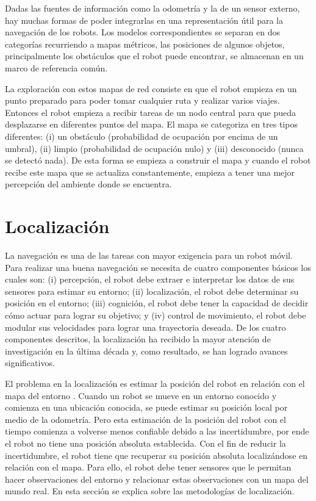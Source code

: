 Dadas las fuentes de informaci\'on como la odometr\'ia y la de un sensor 
externo, hay muchas formas de poder integrarlas en una representaci\'on útil 
para la navegaci\'on de los robots. Los modelos correspondientes se separan 
en dos categor\'ias recurriendo a mapas m\'etricos, las posiciones de algunos 
objetos, principalmente los obst\'aculos que el robot puede encontrar, se 
almacenan en un marco de referencia com\'un.

La exploraci\'on con estos mapas de red consiste en que el robot empieza en 
un punto preparado para poder tomar cualquier ruta y realizar varios 
viajes. Entonces el robot empieza a recibir tareas de un nodo central para 
que pueda desplazarse en diferentes puntos del mapa. El mapa se categoriza 
en tres tipos diferentes: (i) un obst\'aculo (probabilidad de ocupaci\'on 
por encima de un umbral), (ii) limpio (probabilidad de ocupaci\'on nulo) y 
(iii) desconocido (nunca se detectó nada). De esta forma se empieza a 
construir el mapa y cuando el robot recibe este mapa que se actualiza 
constantemente, empieza a tener una mejor percepci\'on del ambiente donde 
se encuentra.


\section{Localizaci\'on}
La navegaci\'on es una de las tareas con mayor exigencia para un robot 
móvil. Para realizar una buena navegaci\'on se necesita de cuatro componentes 
b\'asicos los cuales son: (i) percepci\'on, el robot debe extraer e interpretar 
los datos de sus sensores para estimar su entorno; (ii) localizaci\'on, el robot 
debe determinar su posici\'on en el entorno; (iii) cognici\'on, el robot debe tener 
la capacidad de decidir c\'omo actuar para lograr su objetivo; y (iv) control de 
movimiento, el robot debe modular sus velocidades para lograr una trayectoria 
deseada. De los cuatro componentes descritos, la localizaci\'on ha recibido la 
mayor atenci\'on de investigaci\'on en la \'ultima d\'ecada y, como resultado, se 
han logrado avances significativos. %

El problema en la localización es estimar la posición del robot en 
relación con el mapa del entorno \cite{dellaert1999monte}. Cuando un robot 
se mueve en un entorno conocido y comienza en una ubicación conocida, se puede 
estimar su posición local por medio de la odometría. Pero esta estimación de la 
posición del robot con el tiempo comienza a volverse menos confiable debido a las 
incertidumbre, por ende el robot no tiene una posición absoluta establecida. Con el 
fin de reducir la incertidumbre, el robot tiene que recuperar su posición absoluta 
localizándose en relación con el mapa. Para ello, el robot debe tener sensores que 
le permitan hacer observaciones del entorno y relacionar estas observaciones con un 
mapa del mundo real. En esta sección se explica sobre las metodologías de localización.

